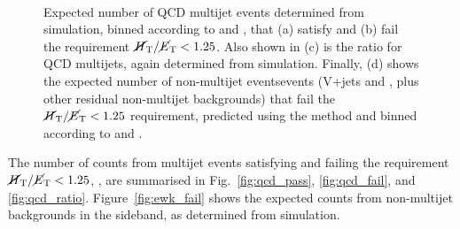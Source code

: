 \begin{figure}[!h]
{   %
  } \\
  \caption{Expected number of QCD multijet events determined from
    simulation, binned according to \njet and \scalht, that (a) satisfy
    and (b) fail the requirement $\mbox{$\mbox{$\cancel{H}_\text{T}$} / \mbox{$\cancel{E}_\text{T}$}$} < 1.25$. Also shown in (c)
    is the ratio \rmhtmet for QCD multijets, again determined from
    simulation. Finally, (d) shows the expected number of non-multijet
    eventsevents
    (V+jets and \ttbar, plus other residual non-multijet backgrounds)
    that fail the $\mbox{$\mbox{$\cancel{H}_\text{T}$} / \mbox{$\cancel{E}_\text{T}$}$} < 1.25$ requirement, predicted using the
    \TF method and binned according to \njet and \scalht.}
  \label{fig:qcd_plots}
\end{figure}

The number of counts from \QCD multijet events satisfying and failing the
requirement $\mbox{$\mbox{$\cancel{H}_\text{T}$} / \mbox{$\cancel{E}_\text{T}$}$} < 1.25$, \rmhtmet, are
summarised in Fig.~\ref{fig:qcd_pass}, \ref{fig:qcd_fail}, and
\ref{fig:qcd_ratio}. Figure~\ref{fig:ewk_fail} shows the expected
counts from non-multijet backgrounds in the \mhtmet sideband, as
determined from simulation.

